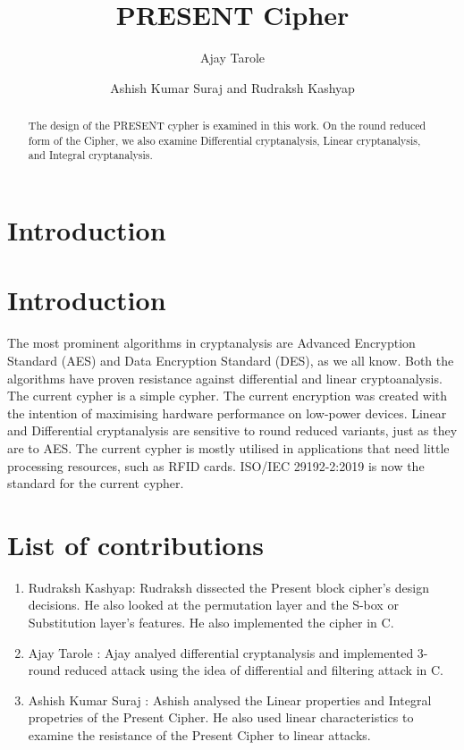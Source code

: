 \documentclass[journal=tosc,preprint]{iacrtrans}
\author{Ajay Tarole\inst{1} \and Ashish Kumar Suraj\inst{2} and Rudraksh Kashyap\inst{3}}
\institute{
  11840090, IIT Bhilai, \email{ajayt@iitbhilai.ac.in}
  \and
  1184230, IIT Bhilai, \email{ashishs@iitbhilai.ac.in}
  \and
  11840970, IIT Bhilai, \email{rudrakshk@iitbhilai.ac.in}
  
}
\title{PRESENT Cipher}
\begin{document}
\maketitle




\begin{abstract}
	The design of the PRESENT cypher is examined in this work. On the round reduced form of the Cipher, we also examine Differential cryptanalysis, Linear cryptanalysis, and Integral cryptanalysis.  
\end{abstract}


\section{Introduction}
\section{Introduction}
The most prominent algorithms in cryptanalysis are Advanced Encryption Standard (AES) and Data Encryption Standard (DES), as we all know. Both the algorithms have proven resistance against differential and linear cryptoanalysis. The current cypher is a simple cypher.
The current encryption was created with the intention of maximising hardware performance on low-power devices. Linear and Differential cryptanalysis are sensitive to round reduced variants, just as they are to AES. The current cypher is mostly utilised in applications that need little processing resources, such as RFID cards. ISO/IEC 29192-2:2019 is now the standard for the current cypher. 
\section{List of contributions}
\begin{enumerate}
	\item Rudraksh Kashyap: Rudraksh dissected the Present block cipher's design decisions. He also looked at the permutation layer and the S-box or Substitution layer's features. He also implemented the cipher in C. 
	\item Ajay Tarole : Ajay analyed differential cryptanalysis and implemented 3-round reduced  attack using the idea of differential and filtering attack in C.
	\item Ashish Kumar Suraj : Ashish analysed the Linear properties and Integral propetries of the Present Cipher. He also used linear characteristics to examine the resistance of the Present Cipher to linear attacks.  
\end{enumerate}
\end{document}
